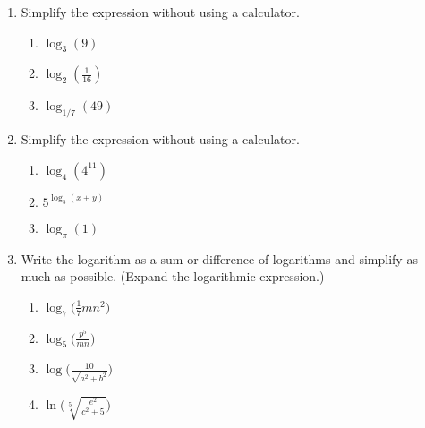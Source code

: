\documentclass[11pt]{article}
\begin{document}
\begin{enumerate}
\item Simplify the expression without using a calculator.
\begin{enumerate}

\item $\log_3(9)$\\

\item $\displaystyle \log_2(\frac{1}{16})$\\

\item $\log_{1/7}(49)$\\



\end{enumerate}




\newpage


\item Simplify the expression without using a calculator.
\begin{enumerate}

\item $\displaystyle \log_4(4^{11})$\\

\item $\displaystyle 5^{\log_5(x+y)}$\\

\item $\log_{\pi}(1)$\\



\end{enumerate}






\item Write the logarithm as a sum or difference of logarithms and simplify as much as possible.  (Expand the logarithmic expression.)
\begin{enumerate}
\item $ \displaystyle \log_7\Big(\frac{1}{7}mn^2\Big)$ 
\vfill
\item $\displaystyle \log_5\Big(\frac{p^5}{mn}\Big)$ 
\vfill

\item $\displaystyle \log\Bigg(\frac{10}{\sqrt{a^2+b^2}}\Bigg)$ 
\vfill

\item $\displaystyle \ln\Bigg(\sqrt[5]{\frac{e^2}{c^2+5}}\Bigg)$ 
\vfill


\end{enumerate}


\end{enumerate}
\end{document}
